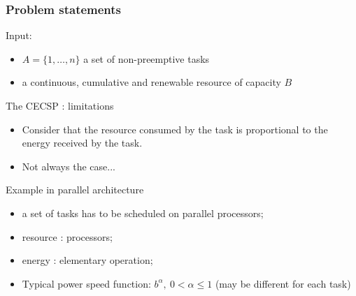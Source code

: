  \begin{frame}
   \frametitle{Problem statements}
   \vfill
   Input:\\
   \begin{itemize}
   \item $A=\{1,\hdots,n\}$ a set of non-preemptive tasks
   \item a continuous, cumulative and renewable resource of capacity  $B$
   \end{itemize}
   \vfill
   \begin{overlayarea}{\linewidth}{1cm}
   \end{overlayarea}
 \end{frame}
 
 
 
 \begin{frame}{The CECSP : limitations}
   \vfill
   \begin{itemize}
   \item Consider that the resource consumed by the task is proportional to
     the energy received by the task.
     \vfill
     \pause
   \item Not always the case...
   \end{itemize}
   \vfill
   \pause
   \begin{block}{Example in parallel architecture}
     \begin{itemize}
     \item a set of tasks has to be scheduled on parallel processors;
       \pause
     \item resource : processors;
       \pause
     \item energy : elementary operation;
       \pause
     \item Typical power speed function:  $b^{\alpha} , \ 0 <
       \alpha \le 1$ (may be different for each task)
       \pause
     \end{itemize}
   \end{block}
   \vfill

 \end{frame}
 
